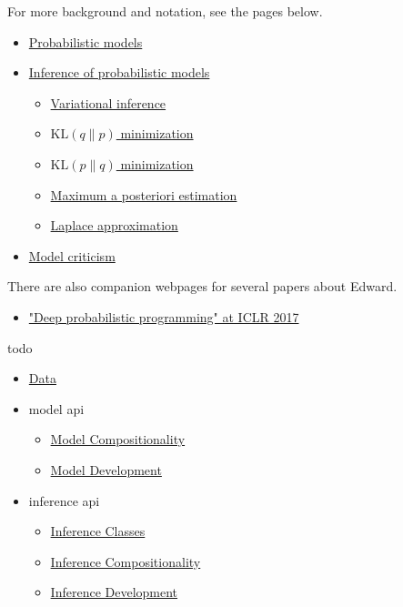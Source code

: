 For more background and notation, see the pages below.
\begin{itemize}
  \item \href{model}{Probabilistic models}
  \item \href{inference}{Inference of probabilistic models}
  \begin{itemize}
   \item \href{variational-inference}{Variational inference}
   \item \href{klqp}{$\text{KL}(q\|p)$ minimization}
   \item \href{klpq}{$\text{KL}(p\|q)$ minimization}
   \item \href{map}{Maximum a posteriori estimation}
   \item \href{map-laplace}{Laplace approximation}
  \end{itemize}
  \item \href{criticism}{Model criticism}
\end{itemize}

There are also companion webpages for several papers about Edward.
\begin{itemize}
\item
\href{/iclr2017}{"Deep probabilistic programming" at ICLR 2017}
\end{itemize}


todo
\begin{itemize}
\item \href{data}{Data}
\item model api
  \begin{itemize}
  \item \href{model-compositionality}{Model Compositionality}
  \item \href{model-development}{Model Development}
  \end{itemize}
\item inference api
  \begin{itemize}
  \item \href{inference-classes}{Inference Classes}
  \item \href{inference-compositionality}{Inference Compositionality}
  \item \href{inference-development}{Inference Development}
  \end{itemize}
\end{itemize}
